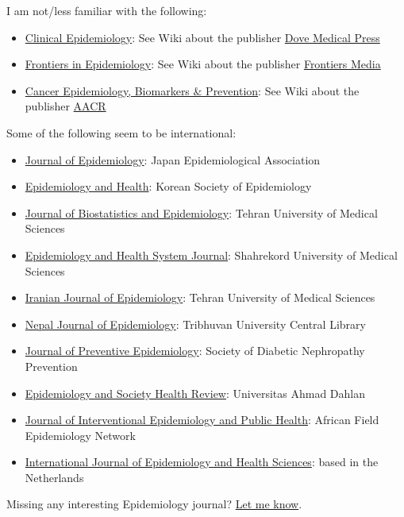 \documentclass[
  12pt,
]{article}
\providecommand{\tightlist}{%
  \setlength{\itemsep}{0pt}\setlength{\parskip}{0pt}}
\begin{document}
I am not/less familiar with the following:

\begin{itemize}
\tightlist
\item
  \href{https://www.dovepress.com/clinical-epidemiology-journal}{Clinical
  Epidemiology}: See Wiki about the publisher
  \href{https://en.wikipedia.org/wiki/Dove_Medical_Press}{Dove Medical
  Press}
\item
  \href{https://www.frontiersin.org/journals/epidemiology}{Frontiers in
  Epidemiology}: See Wiki about the publisher
  \href{https://en.wikipedia.org/wiki/Frontiers_Media}{Frontiers Media}
\item
  \href{https://aacrjournals.org/cebp}{Cancer Epidemiology, Biomarkers
  \& Prevention}: See Wiki about the publisher
  \href{https://en.wikipedia.org/wiki/American_Association_for_Cancer_Research}{AACR}
\end{itemize}

Some of the following seem to be international:

\begin{itemize}
\tightlist
\item
  \href{https://jeaweb.jp/journal/}{Journal of Epidemiology}: Japan
  Epidemiological Association
\item
  \href{https://www.e-epih.org/}{Epidemiology and Health}: Korean
  Society of Epidemiology
\item
  \href{https://jbe.tums.ac.ir/index.php/jbe}{Journal of Biostatistics
  and Epidemiology}: Tehran University of Medical Sciences
\item
  \href{http://ijer.skums.ac.ir/}{Epidemiology and Health System
  Journal}: Shahrekord University of Medical Sciences
\item
  \href{https://irje.tums.ac.ir/en}{Iranian Journal of Epidemiology}:
  Tehran University of Medical Sciences
\item
  \href{https://www.nepjol.info/index.php/NJE}{Nepal Journal of
  Epidemiology}: Tribhuvan University Central Library
\item
  \href{https://jprevepi.com/}{Journal of Preventive Epidemiology}:
  Society of Diabetic Nephropathy Prevention
\item
  \href{http://journal2.uad.ac.id/index.php/eshr/index}{Epidemiology and
  Society Health Review}: Universitas Ahmad Dahlan
\item
  \href{https://www.afenet-journal.net/\#gsc.tab=0}{Journal of
  Interventional Epidemiology and Public Health}: African Field
  Epidemiology Network
\item
  \href{http://www.ijehs.com/}{International Journal of Epidemiology and
  Health Sciences}: based in the Netherlands
\end{itemize}

Missing any interesting Epidemiology journal?
\href{https://ehsank.com/}{Let me know}.
\end{document}
